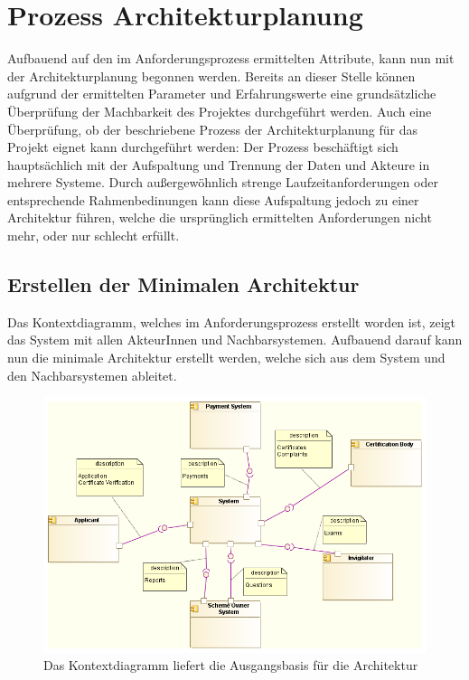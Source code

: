 \chapter{Prozess Architekturplanung}
Aufbauend auf den im Anforderungsprozess ermittelten Attribute, kann nun mit der Architekturplanung begonnen werden. Bereits an dieser Stelle können aufgrund der ermittelten Parameter und Erfahrungswerte eine grundsätzliche Überprüfung der Machbarkeit des Projektes durchgeführt werden. Auch eine Überprüfung, ob der beschriebene Prozess der Architekturplanung für das Projekt eignet kann durchgeführt werden: Der Prozess beschäftigt sich hauptsächlich mit der Aufspaltung und Trennung der Daten und Akteure in mehrere Systeme. Durch außergewöhnlich strenge Laufzeitanforderungen oder entsprechende Rahmenbedinungen kann diese Aufspaltung jedoch zu einer Architektur führen, welche die ursprünglich ermittelten Anforderungen nicht mehr, oder nur schlecht erfüllt.

\section{Erstellen der Minimalen Architektur}
Das Kontextdiagramm, welches im Anforderungsprozess erstellt worden ist, zeigt das System mit allen AkteurInnen und Nachbarsystemen. Aufbauend darauf kann nun die minimale Architektur erstellt werden, welche sich aus dem System und den Nachbarsystemen ableitet.

\begin{figure}[H]
    \centering
    \includegraphics[scale=0.5]{uml/context.png}
    \caption{Das Kontextdiagramm liefert die Ausgangsbasis für die Architektur}
\end{figure}

